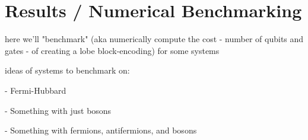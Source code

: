 \section{Results / Numerical Benchmarking}
\label{sec:results}

here we'll "benchmark" (aka numerically compute the cost - number of qubits and gates - of creating a lobe block-encoding) for some systems

ideas of systems to benchmark on:

- Fermi-Hubbard 

- Something with just bosons

- Something with fermions, antifermions, and bosons